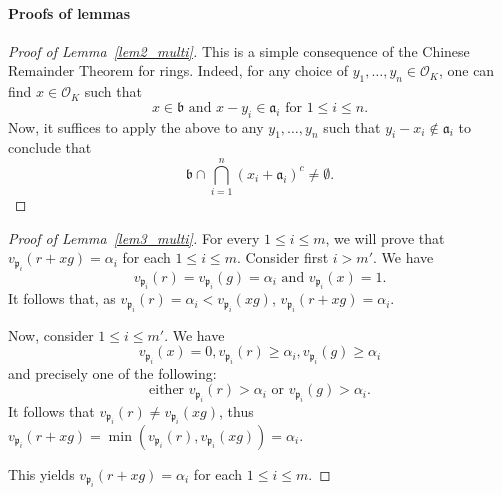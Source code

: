 \documentclass[leqno,a4paper,12pt]{article}
\theoremstyle{definition}
\newcommand{\divides}{\mid}
\newcommand{\OK}{\mathcal{O}_K}
\begin{document}
\paragraph{Proofs of lemmas}
\begin{proof}[Proof of Lemma~\ref{lem2_multi}]
This is a simple consequence of the Chinese Remainder Theorem for rings. Indeed, for any choice of $y_1,\dots, y_n\in\OK$, one can find $x\in \OK$ such that
\[
x\in\mathfrak{b} \text{ and }x-y_i \in\mathfrak{a}_i \text{ for }1\leq i\leq n.
\]
Now, it suffices to apply the above to any $y_1,\dots, y_n$ such that $y_i-x_i\not\in\mathfrak{a}_i$ to conclude that
\[
\mathfrak{b}\cap \bigcap_{i=1}^{n}(x_i+\mathfrak{a}_i)^c\neq\emptyset.
\]
\end{proof}
\begin{proof}[Proof of Lemma~\ref{lem3_multi}]
For every $1\leq i\leq m$, we will prove that $v_{\mathfrak{p}_i}(r+xg)=\alpha_i$ for each $1\leq i\leq m$. Consider first $i>m'$. We have
\[
v_{\mathfrak{p}_i}(r)=v_{\mathfrak{p}_i}(g)=\alpha_i  \text{ and } v_{\mathfrak{p}_i}(x)=1.
\]
It follows that, as $v_{\mathfrak{p}_i}(r)=\alpha_i<v_{\mathfrak{p}_i}(xg)$,  $v_{\mathfrak{p}_i}(r+xg)= \alpha_i$.


Now, consider $1\leq i\leq m'$. We have
\[
v_{\mathfrak{p}_i}(x)=0, v_{\mathfrak{p}_i}(r)\ge \alpha_i, v_{\mathfrak{p}_i}(g)\ge \alpha_i
\]
and precisely one of the following:
\begin{equation}\label{gie1}
\text{either } v_{\mathfrak{p}_i}(r)>\alpha_i \text{ or }v_{\mathfrak{p}_i}(g)>\alpha_i.
\end{equation}
It follows that $v_{\mathfrak{p}_i}(r)\neq v_{\mathfrak{p}_i}(xg)$, thus $v_{\mathfrak{p}_i}(r+xg)=\min(v_{\mathfrak{p}_i}(r),v_{\mathfrak{p}_i}(xg))=\alpha_i$.

This yields $v_{\mathfrak{p}_i}(r+xg)=\alpha_i$ for each $1\leq i\leq m$.
\end{proof}
\end{document}
